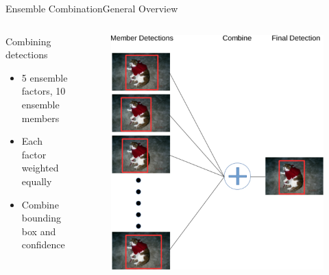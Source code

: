 \begin{frame}{Ensemble Combination}{General Overview}
\begin{columns}
        \begin{block}{Combining detections}
        \begin{itemize}
            \item 5 ensemble factors, 10 ensemble members
            \item Each factor weighted equally
            \item Combine bounding box and confidence
        \end{itemize}
    \end{block}
        \begin{figure}
            \includegraphics[width=1.0 \textwidth]{figs/ensemble.pdf}
        \end{figure}
    \end{columns}
\end{frame}



